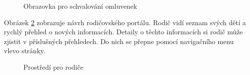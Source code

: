 \begin{figure}[h]
	\centering
	\caption{Obrazovka pro schvalování omluvenek}
	\label{obrazovka-omluvenky}
\end{figure}

Obrázek \ref{obrazovka-rodic} zobrazuje návrh rodičovského portálu. Rodič vidí seznam svých dětí a rychlý přehled o nových informacích. Detaily o těchto informacích si rodič může zjistit v příslušných přehledech. Do nich se přepne pomocí navigačního menu vlevo stránky.
\clearpage

\begin{figure}[H]
	\centering
	\caption{Prostředí pro rodiče}
	\label{obrazovka-rodic}
\end{figure}


